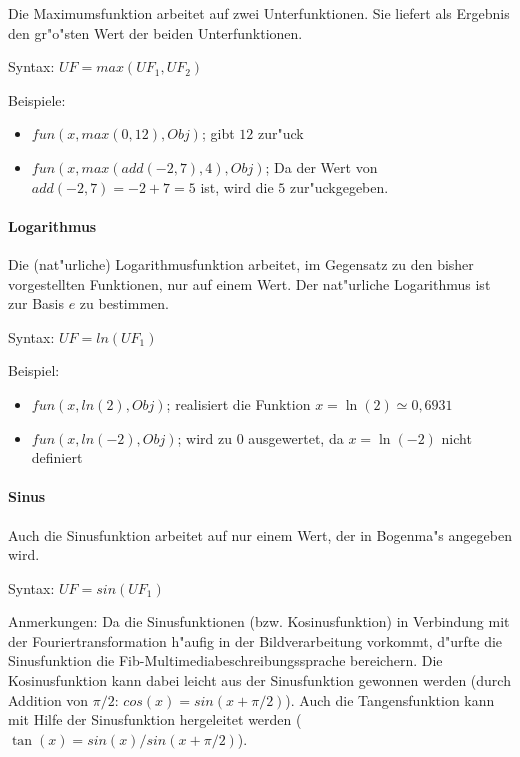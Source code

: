 Die Maximumsfunktion arbeitet auf zwei Unterfunktionen. Sie liefert als Ergebnis den gr"o"sten Wert der beiden Unterfunktionen.

\bigskip\noindent
Syntax:
$UF=max( UF_1, UF_2 )$

\bigskip\noindent
Beispiele:
\begin{itemize}
 \item $fun(x, max( 0, 12 ), Obj)$; gibt $12$ zur"uck
 \item $fun(x, max( add( -2, 7 ), 4 ), Obj)$; Da der Wert von $add( -2, 7 )= -2+7 = 5$ ist, wird die $5$ zur"uckgegeben.
\end{itemize}


\paragraph{Logarithmus}

Die (nat"urliche) Logarithmusfunktion arbeitet, im Gegensatz zu den bisher vorgestellten Funktionen, nur auf einem Wert. Der nat"urliche Logarithmus ist zur Basis $e$ zu bestimmen.

\bigskip\noindent
Syntax:
$UF=ln(UF_1)$

\bigskip\noindent
Beispiel:
\begin{itemize}
 \item $fun(x, ln(2), Obj)$; realisiert die Funktion $x=\ln{(2)} \simeq 0{,}6931$
 \item $fun(x, ln(-2), Obj)$; wird zu $0$ ausgewertet, da $x=\ln{(-2)}$ nicht definiert
\end{itemize}


\paragraph{Sinus}

Auch die Sinusfunktion arbeitet auf nur einem Wert, der in Bogenma"s angegeben wird.

\bigskip\noindent
Syntax:
$UF=sin(UF_1)$

\bigskip\noindent
Anmerkungen:
Da die Sinusfunktionen (bzw. Kosinusfunktion) in Verbindung mit der Fouriertransformation h"aufig in der Bildverarbeitung vorkommt, d"urfte die Sinusfunktion die Fib-Multimediabeschreibungssprache bereichern. Die Kosinusfunktion kann dabei leicht aus der Sinusfunktion gewonnen werden (durch Addition von $\pi/2$: $cos{(x)}=sin{(x+\pi/2)}$). Auch die Tangensfunktion kann mit Hilfe der Sinusfunktion hergeleitet werden ($\tan{(x)}=sin{(x)}/sin{(x+\pi/2)}$).

